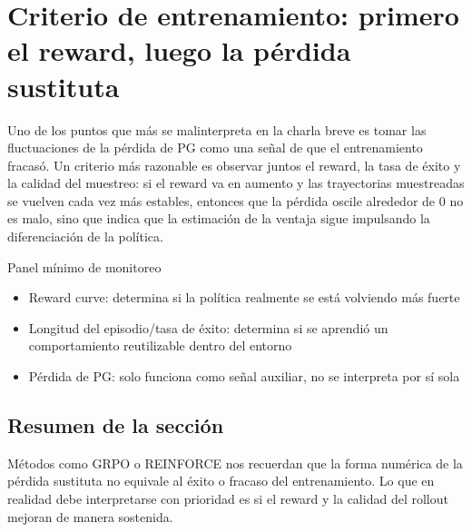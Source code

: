 \section{Criterio de entrenamiento: primero el reward, luego la pérdida sustituta}
Uno de los puntos que más se malinterpreta en la charla breve es tomar las fluctuaciones de la pérdida de PG como una señal de que el entrenamiento fracasó. Un criterio más razonable es observar juntos el reward, la tasa de éxito y la calidad del muestreo: si el reward va en aumento y las trayectorias muestreadas se vuelven cada vez más estables, entonces que la pérdida oscile alrededor de 0 no es malo, sino que indica que la estimación de la ventaja sigue impulsando la diferenciación de la política.

\begin{knowledgebox}{Panel mínimo de monitoreo}
\begin{itemize}
  \item Reward curve: determina si la política realmente se está volviendo más fuerte
  \item Longitud del episodio/tasa de éxito: determina si se aprendió un comportamiento reutilizable dentro del entorno
  \item Pérdida de PG: solo funciona como señal auxiliar, no se interpreta por sí sola
\end{itemize}
\end{knowledgebox}

\subsection{Resumen de la sección}
Métodos como GRPO o REINFORCE nos recuerdan que la forma numérica de la pérdida sustituta no equivale al éxito o fracaso del entrenamiento. Lo que en realidad debe interpretarse con prioridad es si el reward y la calidad del rollout mejoran de manera sostenida.

\newpage
